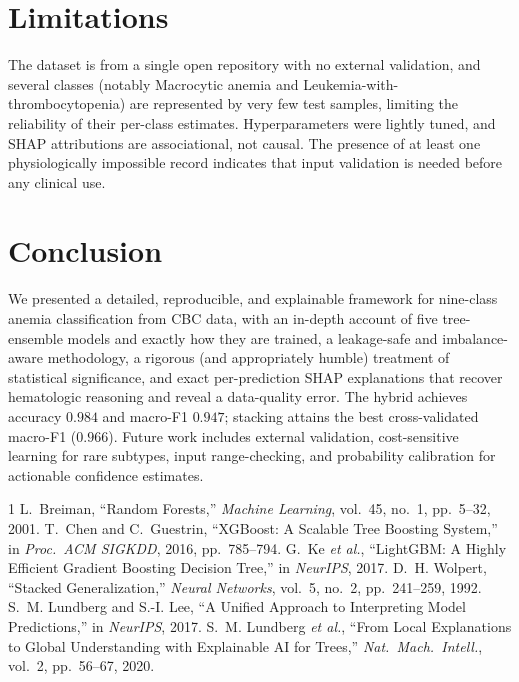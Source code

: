 \documentclass[conference]{IEEEtran}
\begin{document}
\section{Limitations}
The dataset is from a single open repository with no external validation, and
several classes (notably Macrocytic anemia and Leukemia-with-thrombocytopenia) are
represented by very few test samples, limiting the reliability of their per-class
estimates. Hyperparameters were lightly tuned, and SHAP attributions are
associational, not causal. The presence of at least one physiologically impossible
record indicates that input validation is needed before any clinical use.

\section{Conclusion}
We presented a detailed, reproducible, and explainable framework for nine-class
anemia classification from CBC data, with an in-depth account of five tree-ensemble
models and exactly how they are trained, a leakage-safe and imbalance-aware
methodology, a rigorous (and appropriately humble) treatment of statistical
significance, and exact per-prediction SHAP explanations that recover hematologic
reasoning and reveal a data-quality error. The hybrid achieves accuracy $0.984$ and
macro-F1 $0.947$; stacking attains the best cross-validated macro-F1 ($0.966$).
Future work includes external validation,
cost-sensitive learning for rare subtypes, input range-checking, and probability
calibration for actionable confidence estimates.

\begin{thebibliography}{1}
L.~Breiman, ``Random Forests,'' \emph{Machine Learning}, vol.~45, no.~1,
pp.~5--32, 2001.
T.~Chen and C.~Guestrin, ``XGBoost: A Scalable Tree Boosting System,'' in
\emph{Proc.\ ACM SIGKDD}, 2016, pp.~785--794.
G.~Ke \emph{et al.}, ``LightGBM: A Highly Efficient Gradient Boosting Decision
Tree,'' in \emph{NeurIPS}, 2017.
D.~H. Wolpert, ``Stacked Generalization,'' \emph{Neural Networks}, vol.~5, no.~2,
pp.~241--259, 1992.
S.~M. Lundberg and S.-I. Lee, ``A Unified Approach to Interpreting Model
Predictions,'' in \emph{NeurIPS}, 2017.
S.~M. Lundberg \emph{et al.}, ``From Local Explanations to Global Understanding
with Explainable AI for Trees,'' \emph{Nat.\ Mach.\ Intell.}, vol.~2, pp.~56--67,
2020.
\end{thebibliography}
\end{document}
